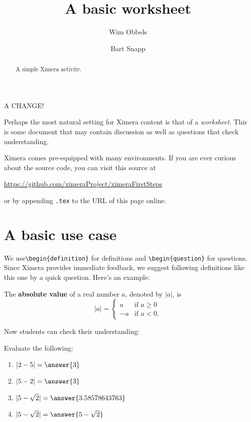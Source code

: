 \documentclass{ximera}
\title{A basic worksheet}
\author{Wim Obbels \and Bart Snapp}
\begin{document}
\begin{abstract}
    A simple Ximera activity.
\end{abstract}
\maketitle

{\huge A CHANGE!}

Perhaps the most natural setting for Ximera content is that of a
\textit{worksheet}. This is some document that may contain discussion as well
as questions that check understanding.

Ximera comes pre-equipped with many environments.  If you are ever curious about
the source code, you can visit this source at

\begin{center}
    \url{https://github.com/ximeraProject/ximeraFirstSteps}
\end{center}
or by appending \verb|.tex| to the URL of this page online. 


\section{A basic use case}
We use\verb|\begin{definition}| for definitions and \verb|\begin{question}| for
questions. Since Ximera provides immediate feedback, we suggest following
definitions like this one by a quick question. Here's an example:

\begin{definition}
    The \textbf{absolute value} of a real number $a$, denoted by $|a|$, is
    \[
        |a| = \begin{cases}
            a  & \text{if $a \geq 0$} \\
            -a & \text{if $a<0$.}
        \end{cases}
    \]
\end{definition}
Now students can check their understanding:
\begin{question}
    Evaluate the following:
    \begin{enumerate}
        \item $|2-5| = \answer{3}$
        \item $|5-2| = \answer{3}$
        \item $|5-\sqrt{2}| = \answer{3.58578643763}$
        \item $|5-\sqrt{2}| = \answer{5-\sqrt{2}}$
    \end{enumerate}
\end{question}
\end{document}
